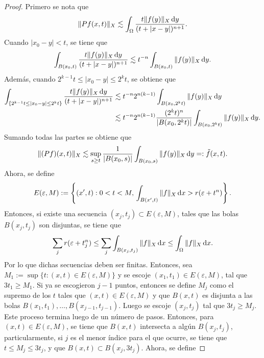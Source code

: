 \begin{proof}
	Primero se nota que 
	\begin{equation*}
		\|Pf(x, t)\|_X \lesssim \int_{\Omega} \frac{t\|f(y)\|_X\mathop{}\!\mathrm{d} y}{(t + |x-y|)^{n+1}}.
	\end{equation*}
	Cuando $|x_0-y|<t$, se tiene que
	\begin{equation*}
		\int_{B(x_0, t)} \frac{t\|f(y)\|_X\mathop{}\!\mathrm{d} y}{(t + |x-y|)^{n+1}} \lesssim t^{-n}  \int_{B(x_0, t)}  \|f(y)\|_X\mathop{}\!\mathrm{d} y.
	\end{equation*}
	Además, cuando $2^{k-1}t \leq |x_0-y|\leq 2^kt$, se obtiene que
	\begin{align*}
		\int_{\{2^{k-1}t \leq |x_0-y|\leq 2^kt\}} \frac{t\|f(y)\|_X\mathop{}\!\mathrm{d} y}{(t + |x-y|)^{n+1}}& \lesssim t^{-n}2^{n(k-1)}  \int_{B(x_0, 2^kt)}\| f(y)\|_X\mathop{}\!\mathrm{d} y \\
		& \lesssim t^{-n}2^{n(k-1)} \frac{(2^kt)^{n}}{|B(x_0, 2^kt)|} \int_{B(x_0, 2^kt)}  \|f(y)\|_X\mathop{}\!\mathrm{d} y.
	\end{align*}
	Sumando todas las partes se obtiene que 
	\begin{equation*}
		\|(Pf)(x, t)\|_X \lesssim \sup_{s\geq t}  \frac{1}{|B(x_0, s)|}\int_{B(x_0, s)}\|f(y)\|_X \mathop{}\!\mathrm{d} y =: \tilde{f}(x, t).
	\end{equation*}
	Ahora, se define 
	\begin{equation*}
		E(\varepsilon, M) := \left\{ (x', t) : 0<t<M, \, \int_{B(x', t)} \|f\|_X\mathop{}\!\mathrm{d} x > r(\varepsilon + t^n) \right\}.
	\end{equation*}
	Entonces, si existe una secuencia $(x_j, t_j) \subset E(\varepsilon, M)$, tales que las bolas $B(x_j, t_j)$ son disjuntas, se tiene que
	\begin{equation*}
		\sum_j r(\varepsilon + t_j^n) \leq \sum_j \int_{B(x_j, t_j)} \|f\|_X \mathop{}\!\mathrm{d} x\leq \int_{\Omega} \|f\|_X \mathop{}\!\mathrm{d} x.
	\end{equation*} 
	Por lo que dichas secuencias deben ser finitas. Entonces, sea $M_1 := \sup\{t:(x, t)\in E(\varepsilon, M)\}$ y se escoje $(x_1, t_1)\in E(\varepsilon, M)$, tal que $3t_1 \geq M_1$. Si ya se escogieron $j-1$ puntos, entonces se define $M_j$ como el supremo de los $t$ tales que $(x, t)\in E(\varepsilon, M)$ y que $B(x, t)$ es disjunta a las bolas $B(x_1, t_1),\ldots,B(x_{j-1}, t_{j-1})$. Luego se escoje $(x_j, t_j)$ tal que $3t_j \geq M_j$. Este proceso termina luego de un número de pasos. Entonces, para $(x, t)\in E(\varepsilon, M)$, se tiene que $B(x, t)$ intersecta a algún $B(x_j, t_j)$, particularmente, si $j$ es el menor índice para el que ocurre, se tiene que $t\leq M_j \leq 3t_j$, y que $B(x, t) \subset B(x_j, 3t_j)$. Ahora, se define

\end{proof}
